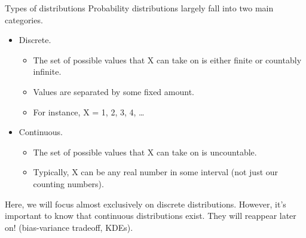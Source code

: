 \documentclass[aspectratio=169]{../latex_main/tntbeamer}  %
\begin{document}
	
	\begin{frame}[c]{Types of distributions}
	    Probability distributions largely fall into two main categories.\\
	    \begin{itemize}
	        \item Discrete.
	        \begin{itemize}
	            \item The set of possible values that X can take on is either finite or countably infinite.
	            \item Values are separated by some fixed amount. 
	            \item For instance, X = 1, 2, 3, 4, …
	        \end{itemize}
	        \item Continuous.
	        \begin{itemize}
	            \item The set of possible values that X can take on is uncountable.
	            \item Typically, X can be any real number in some interval (not just our counting numbers).
	        \end{itemize}
	    \end{itemize}
	    Here, we will focus almost exclusively on discrete distributions. However, it’s important to know that continuous distributions exist. They will reappear later on! (bias-variance tradeoff, KDEs).

	\end{frame}
	
\end{document}
